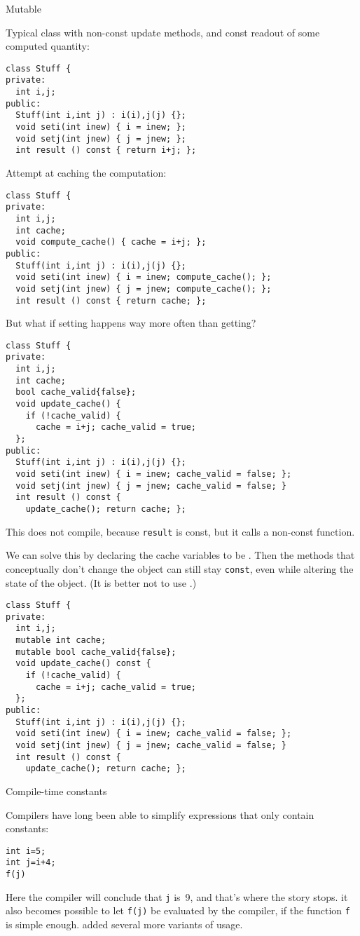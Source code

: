  {Mutable}

Typical class with non-const update methods,
and const readout of some computed quantity:
\begin{lstlisting}
class Stuff {
private:
  int i,j;
public:
  Stuff(int i,int j) : i(i),j(j) {};
  void seti(int inew) { i = inew; };
  void setj(int jnew) { j = jnew; };
  int result () const { return i+j; };
\end{lstlisting}
Attempt at caching the computation:
\begin{lstlisting}
class Stuff {
private:
  int i,j;
  int cache;
  void compute_cache() { cache = i+j; };
public:
  Stuff(int i,int j) : i(i),j(j) {};
  void seti(int inew) { i = inew; compute_cache(); };
  void setj(int jnew) { j = jnew; compute_cache(); };
  int result () const { return cache; };
\end{lstlisting}
But what if setting happens way more often than getting?
\begin{lstlisting}
class Stuff {
private:
  int i,j;
  int cache;
  bool cache_valid{false};
  void update_cache() {
    if (!cache_valid) {
      cache = i+j; cache_valid = true;
  };
public:
  Stuff(int i,int j) : i(i),j(j) {};
  void seti(int inew) { i = inew; cache_valid = false; };
  void setj(int jnew) { j = jnew; cache_valid = false; }
  int result () const {
    update_cache(); return cache; };
\end{lstlisting}
This does not compile, because \lstinline{result} is const, but it
calls a non-const function.

We can solve this by
declaring the cache variables to be .
Then the methods that conceptually don't change the object
can still stay \lstinline{const}, even while altering the state of the
object.
%
(It is better not to use .)

\begin{lstlisting}
class Stuff {
private:
  int i,j;
  mutable int cache;
  mutable bool cache_valid{false};
  void update_cache() const {
    if (!cache_valid) {
      cache = i+j; cache_valid = true;
  };
public:
  Stuff(int i,int j) : i(i),j(j) {};
  void seti(int inew) { i = inew; cache_valid = false; };
  void setj(int jnew) { j = jnew; cache_valid = false; }
  int result () const {
    update_cache(); return cache; };
\end{lstlisting}

 {Compile-time constants}

Compilers have long been able to simplify expressions that only
contain constants:
\begin{lstlisting}
int i=5;
int j=i+4;
f(j)
\end{lstlisting}
Here the compiler will conclude that \lstinline{j} is~9, and that's
where the story stops. it also
becomes possible to let \lstinline{f(j)} be evaluated by the compiler,
if the function \lstinline{f} is simple enough.
 added several more variants of
 usage.

